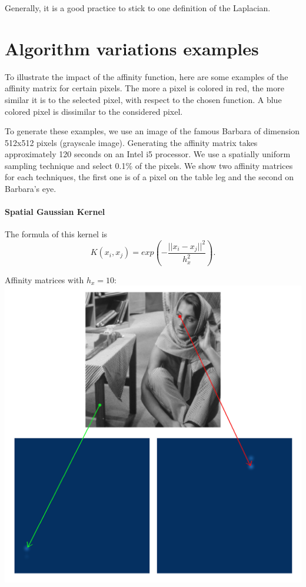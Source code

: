 Generally, it is a good practice to stick to one definition of the Laplacian.

\section{Algorithm variations examples}

To illustrate the impact of the affinity function, here are some examples of the affinity matrix for certain pixels.
The more a pixel is colored in red, the more similar it is to the selected pixel, with respect to the chosen function.
A blue colored pixel is dissimilar to the considered pixel.

To generate these examples, we use an image of the famous Barbara of dimension 512x512 pixels (grayscale image).
Generating the affinity matrix takes approximately 120 seconds on an Intel i5 processor.
We use a spatially uniform sampling technique and select 0.1\% of the pixels.
We show two affinity matrices for each techniques, the first one is of a pixel on the table leg and the second on Barbara's eye.


\paragraph{Spatial Gaussian Kernel}
The formula of this kernel is
\[K(x_i, x_j) = exp(-\frac{||x_i - x_j||^2}{h_x^2}).\]

Affinity matrices with \(h_x = 10\): \\
\includegraphics[width=\textwidth]{img/spatialAffinitySigma10.png}

